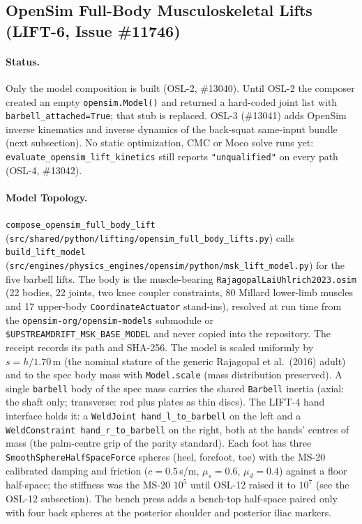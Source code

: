 \documentclass[11pt,a4paper]{article}
\begin{document}
\subsection{OpenSim Full-Body Musculoskeletal Lifts (LIFT-6, Issue \#11746)}
\paragraph{Status.} Only the model composition is built (OSL-2, \#13040).
Until OSL-2 the composer created an empty \texttt{opensim.Model()} and returned
a hard-coded joint list with \texttt{barbell\_attached=True}; that stub is
replaced. OSL-3 (\#13041) adds OpenSim inverse kinematics and inverse
dynamics of the back-squat same-input bundle (next subsection). No static
optimization, CMC or Moco solve runs yet:
\texttt{evaluate\_opensim\_lift\_kinetics} still reports
\texttt{"unqualified"} on every path (OSL-4, \#13042).

\paragraph{Model Topology.} \texttt{compose\_opensim\_full\_body\_lift}
(\texttt{src/shared/python/lifting/opensim\_full\_body\_lifts.py}) calls
\texttt{build\_lift\_model}
(\texttt{src/engines/physics\_engines/opensim/python/msk\_lift\_model.py}) for
the five barbell lifts. The body is the muscle-bearing
\texttt{RajagopalLaiUhlrich2023.osim} (22 bodies, 22 joints, two knee coupler
constraints, 80 Millard lower-limb muscles and 17 upper-body
\texttt{CoordinateActuator} stand-ins), resolved at run time from the
\texttt{opensim-org/opensim-models} submodule or
\texttt{\$UPSTREAMDRIFT\_MSK\_BASE\_MODEL} and never copied into the
repository. The receipt records its path and SHA-256. The model is scaled
uniformly by $s = h / 1.70\,\mathrm{m}$ (the nominal stature of the generic
Rajagopal et al.\ (2016) adult) and to the spec body mass with
\texttt{Model.scale} (mass distribution preserved). A single
\texttt{barbell} body of the spec mass carries the shared
\texttt{Barbell} inertia (axial: the shaft only; transverse: rod plus plates
as thin discs). The LIFT-4 hand interface holds it: a
\texttt{WeldJoint hand\_l\_to\_barbell} on the left and a
\texttt{WeldConstraint hand\_r\_to\_barbell} on the right, both at the hands'
centres of mass (the palm-centre grip of the parity standard). Each foot has
three \texttt{SmoothSphereHalfSpaceForce} spheres (heel, forefoot, toe) with
the MS-20 calibrated damping and friction ($c = 0.5$\,s/m,
$\mu_s = 0.6$, $\mu_d = 0.4$) against a floor half-space; the stiffness
was the MS-20 $10^5$ until OSL-12 raised it to $10^7$ (see the OSL-12
subsection). The bench press
adds a bench-top half-space paired only with four back spheres at the
posterior shoulder and posterior iliac markers.
\end{document}
